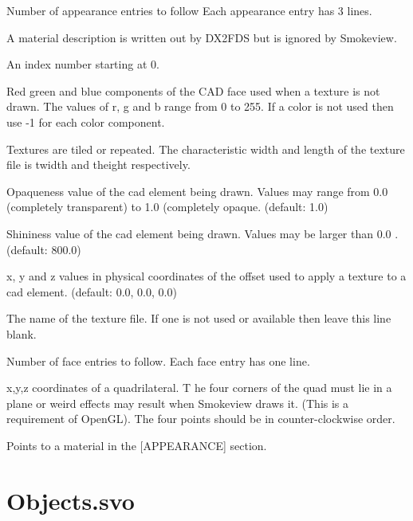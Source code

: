 \documentclass[11pt,twoside]{book}
\newcommand{\parma}{.75}
\newcommand{\parmb}{.5}
\newcommand{\parmc}{0.25}
\newcommand{\blist}{
\begin{list}
{}{
\setlength{\leftmargin}{\parma in}
\setlength{\labelwidth}{\parmb in}
\setlength{\labelsep}{\parmc in}
\setlength{\listparindent}{0.3in}
\setlength{\topsep}{.3in}
\setlength{\parsep}{.0in}
}}
\newcommand{\elist}{\end{list}}
\newcommand{\hitem}[1]{\item[{\bf #1} \hfill]}
\begin{document}
\blist

\hitem{nappearances} Number of appearance entries to follow
Each appearance entry has 3 lines.
\hitem{string} A material description is written out by DX2FDS but is ignored by Smokeview.
\hitem{index} An index number starting at 0.
\hitem{r, g, b} Red green and blue components of the CAD face used when a texture is not drawn.
The values of r, g and b range from 0 to 255.  If a color is not used
then use -1 for each color component.
\hitem{twidth, theight} Textures are tiled or repeated.
The characteristic width and length of the
texture file is twidth and theight respectively.
\hitem{alpha}Opaqueness value of the cad element being drawn.
Values may range from 0.0 (completely transparent)
to 1.0 (completely opaque.  (default: 1.0)
\hitem{shininess} Shininess value of the cad element being drawn.
Values may be larger than 0.0 .  (default: 800.0)
\hitem{tx0, ty0, tz0} x, y and z values in physical coordinates of the offset used to apply a
texture to a cad element. (default: 0.0, 0.0, 0.0)
\hitem{tfile} The name of the texture file.  If one is not used or
available then leave this line blank.
\hitem{nfaces} Number of face entries to follow.  Each face entry has one line.
\hitem{x1/y1/z1/.../x4/y4/z4}x,y,z coordinates of a quadrilateral.  T
he four corners of the quad
must lie in a plane or weird effects may result when Smokeview draws it.
(This is a requirement
of OpenGL).  The four points should be in counter-clockwise order.
\hitem{index} Points to a material in the [APPEARANCE] section.
\elist

\section{Objects.svo}
\label{section:objects}

\end{document}

